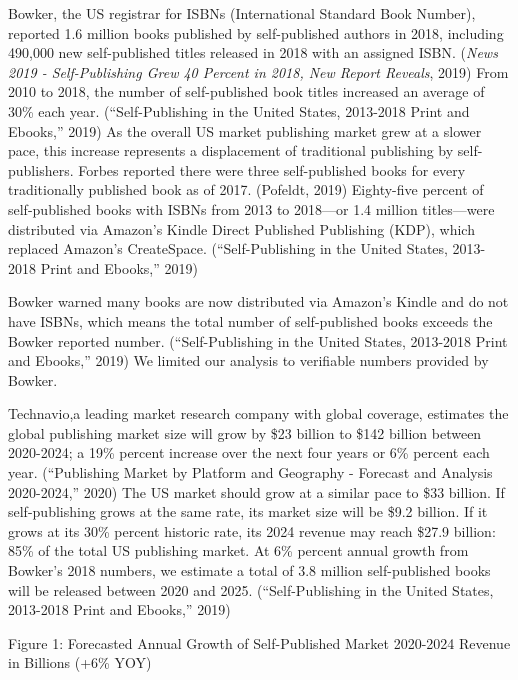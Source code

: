 \documentclass[10pt,openany]{book}
\begin{document}
Bowker, the US registrar for ISBNs (International Standard Book Number),
reported 1.6 million books published by self-published authors in 2018,
including 490,000 new self-published titles released in 2018 with an
assigned ISBN. (\emph{News 2019 - Self-Publishing Grew 40 Percent in
2018, New Report Reveals}, 2019) From 2010 to 2018, the number of
self-published book titles increased an average of 30\% each year.
(``Self-Publishing in the United States, 2013-2018 Print and Ebooks,''
2019) As the overall US market publishing market grew at a slower pace,
this increase represents a displacement of traditional publishing by
self-publishers. Forbes reported there were three self-published books
for every traditionally published book as of 2017. (Pofeldt, 2019)
Eighty-five percent of self-published books with ISBNs from 2013 to
2018---or 1.4 million titles---were distributed via Amazon's Kindle
Direct Published Publishing (KDP), which replaced Amazon's CreateSpace.
(``Self-Publishing in the United States, 2013-2018 Print and Ebooks,''
2019)

Bowker warned many books are now distributed via Amazon's Kindle and do
not have ISBNs, which means the total number of self-published books
exceeds the Bowker reported number. (``Self-Publishing in the United
States, 2013-2018 Print and Ebooks,'' 2019) We limited our analysis to
verifiable numbers provided by Bowker.

Technavio,a leading market research company with global coverage,
estimates the global publishing market size will grow by \$23 billion to
\$142 billion between 2020-2024; a 19\% percent increase over the next
four years or 6\% percent each year. (``Publishing Market by Platform
and Geography - Forecast and Analysis 2020-2024,'' 2020) The US market
should grow at a similar pace to \$33 billion. If self-publishing grows
at the same rate, its market size will be \$9.2 billion. If it grows at
its 30\% percent historic rate, its 2024 revenue may reach \$27.9
billion: 85\% of the total US publishing market. At 6\% percent annual
growth from Bowker's 2018 numbers, we estimate a total of 3.8 million
self-published books will be released between 2020 and 2025.
(``Self-Publishing in the United States, 2013-2018 Print and Ebooks,''
2019)

Figure 1: Forecasted Annual Growth of Self-Published Market 2020-2024
Revenue in Billions (+6\% YOY)

\begin{longtable}[]{@{}l@{}}
\toprule
\endhead
\bottomrule
\end{longtable}
\end{document}
